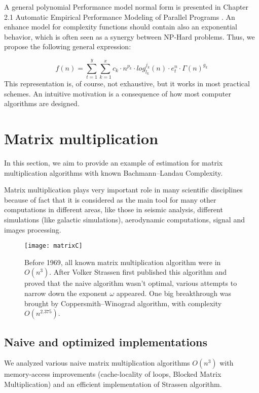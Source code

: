 A general polynomial Performance model normal form is presented in Chapter 2.1 Automatic Empirical Performance Modeling of Parallel Programs \cite{calotoiu2018automatic}. An enhance model for complexity functions should contain also an exponential behavior, which is often seen as a synergy between NP-Hard problems. Thus, we propose the following general expression:

\[ f(n) =\sum\limits_{t=1}^{y}  \sum\limits_{k=1}^{x} c_{k} \cdot n^{p_{k}} \cdot log_{l_{k}}^{j_{k}}(n) \cdot e_{t}^{n} \cdot  \Gamma(n)^{g_{k}} \]
This representation is, of course, not exhaustive, but it works in most practical schemes. An intuitive motivation is a consequence of how most computer algorithms are designed. \cite{calotoiu2018automatic}



\section{Matrix multiplication}
In this section, we aim to provide an example of estimation for matrix multiplication algorithms with known Bachmann–Landau Complexity.

Matrix multiplication plays very important role in many scientific disciplines because of fact that it is considered as the main tool for many other computations in different areas, like those in seismic analysis, different simulations (like galactic simulations), aerodynamic computations, signal and images processing. \cite{4588528}


\begin{figure}[H]
\centering
\texttt{[image: matrixC]}
\caption{Before 1969, all known matrix multiplication algorithm were in $O(n^3)$. After Volker Strassen first published this algorithm and proved that the naive algorithm wasn't optimal, various attempts to narrow down the exponent $\omega$ appeared. One big breakthrough was brought by Coppersmith–Winograd algorithm, with complexity $O(n^{2.375})$. }
\end{figure}

\subsection{Naive and optimized implementations}
We analyzed various naive matrix multiplication algorithms $O(n^3)$ with memory-access improvements (cache-locality of loops, Blocked Matrix Multiplication) and an efficient implementation of Strassen algorithm.

